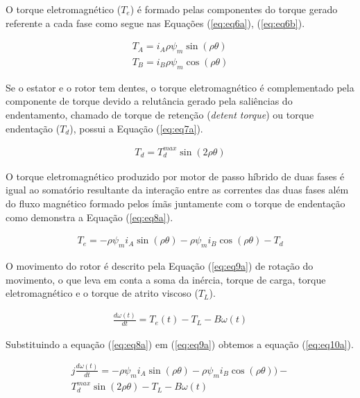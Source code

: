 O torque eletromagnético ($T_e$) é formado pelas componentes do torque gerado referente a cada fase como segue nas Equações (\ref{eq:eq6a}), (\ref{eq:eq6b}).

\begin{eqnarray}
\label{eq:eq6a}
T_A = i_A \rho \psi_m \sin(\rho \theta)\\
\label{eq:eq6b}
T_B = i_B \rho \psi_m \cos(\rho \theta) 
\end{eqnarray}

Se o estator e o rotor tem dentes, o torque eletromagnético é complementado pela componente de torque devido a relutância gerado pela saliências do endentamento, chamado de torque de retenção (\textit{detent torque}) ou torque endentação ($T_d$), possui a Equação (\ref{eq:eq7a}).

\begin{eqnarray}
\label{eq:eq7a}
T_d = T_{d}^{max}\sin(2 \rho \theta)
\end{eqnarray}

O torque eletromagnético produzido por motor de passo híbrido de duas fases é igual ao somatório resultante da interação entre as correntes das duas fases além do fluxo magnético formado pelos ímãs juntamente com o torque de endentação como demonstra a Equação (\ref{eq:eq8a}).

\begin{eqnarray}
	\label{eq:eq8a}
	T_e = - \rho \psi_m i_A \sin(\rho \theta) - \rho \psi_m i_B \cos(\rho \theta ) - T_d
\end{eqnarray}

O movimento do rotor é descrito pela Equação (\ref{eq:eq9a}) de rotação do movimento, o que leva em conta a soma da inércia, torque de carga, torque eletromagnético e o torque de atrito viscoso ($T_L$).

\begin{eqnarray}
\label{eq:eq9a}
\frac{d\omega(t)}{dt} = T_e(t) - T_L - B\omega(t)
\end{eqnarray}

Substituindo a equação (\ref{eq:eq8a}) em (\ref{eq:eq9a}) obtemos a equação (\ref{eq:eq10a}).

\scriptsize

\begin{eqnarray}
\label{eq:eq10a}
j\frac{d\omega(t)}{dt} = - \rho \psi_m i_A \sin(\rho \theta) - \rho \psi_m i_B \cos(\rho \theta ) )-\\ \nonumber T_{d}^{max}\sin(2 \rho \theta)  - T_L - B\omega(t)
\end{eqnarray}

